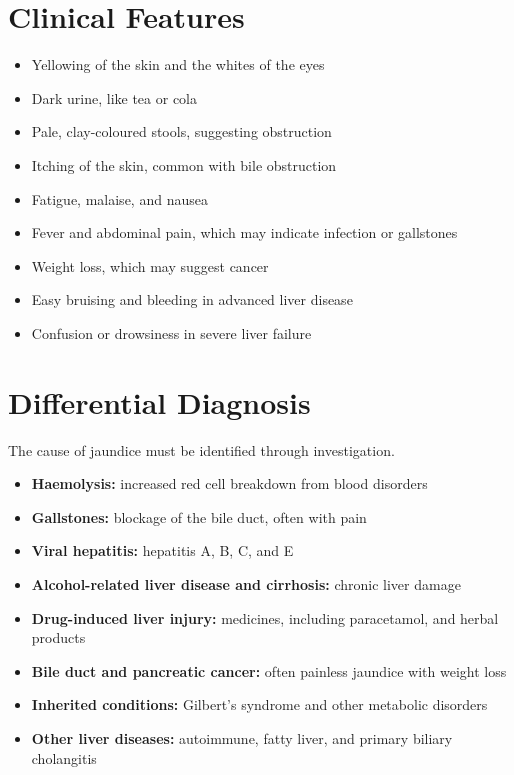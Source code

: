 \section*{Clinical Features}
\begin{itemize}
    \item Yellowing of the skin and the whites of the eyes
    \item Dark urine, like tea or cola
    \item Pale, clay-coloured stools, suggesting obstruction
    \item Itching of the skin, common with bile obstruction
    \item Fatigue, malaise, and nausea
    \item Fever and abdominal pain, which may indicate infection or gallstones
    \item Weight loss, which may suggest cancer
    \item Easy bruising and bleeding in advanced liver disease
    \item Confusion or drowsiness in severe liver failure
\end{itemize}

\section*{Differential Diagnosis}
The cause of jaundice must be identified through investigation.
\begin{itemize}
    \item \textbf{Haemolysis:} increased red cell breakdown from blood disorders
    \item \textbf{Gallstones:} blockage of the bile duct, often with pain
    \item \textbf{Viral hepatitis:} hepatitis A, B, C, and E
    \item \textbf{Alcohol-related liver disease and cirrhosis:} chronic liver damage
    \item \textbf{Drug-induced liver injury:} medicines, including paracetamol, and herbal products
    \item \textbf{Bile duct and pancreatic cancer:} often painless jaundice with weight loss
    \item \textbf{Inherited conditions:} Gilbert's syndrome and other metabolic disorders
    \item \textbf{Other liver diseases:} autoimmune, fatty liver, and primary biliary cholangitis
\end{itemize}

